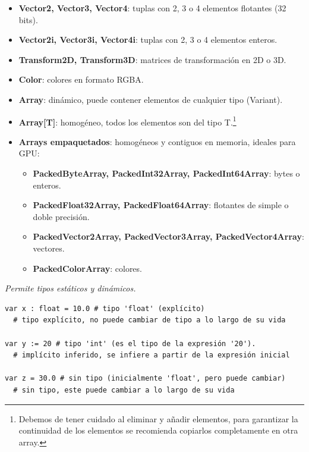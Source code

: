 \documentclass[12pt]{report} %
\begin{document}
\begin{itemize}
\item \textbf{Vector2, Vector3, Vector4}: tuplas con 2, 3 o 4 elementos flotantes (32 bits).
\item \textbf{Vector2i, Vector3i, Vector4i}: tuplas con 2, 3 o 4 elementos enteros.
\item \textbf{Transform2D, Transform3D}: matrices de transformación en 2D o 3D.
\end{itemize}

\begin{itemize}
\item \textbf{Color}: colores en formato RGBA.
\end{itemize}

\begin{itemize}
\item \textbf{Array}: dinámico, puede contener elementos de cualquier tipo (Variant).
\item \textbf{Array[T]}: homogéneo, todos los elementos son del tipo T.\footnote{Debemos de tener cuidado al eliminar y añadir elementos, para garantizar la continuidad de los elementos se recomienda copiarlos completamente en otra array.}
\item \textbf{Arrays empaquetados}: homogéneos y contiguos en memoria, ideales para GPU:
  \begin{itemize}
  \item \textbf{PackedByteArray, PackedInt32Array, PackedInt64Array}: bytes o enteros.
  \item \textbf{PackedFloat32Array, PackedFloat64Array}: flotantes de simple o doble precisión.
  \item \textbf{PackedVector2Array, PackedVector3Array, PackedVector4Array}: vectores.
  \item \textbf{PackedColorArray}: colores.
  \end{itemize}
\end{itemize}

\emph{Permite tipos estáticos y dinámicos.}

\begin{lstlisting}
var x : float = 10.0 # tipo 'float' (explícito) 
  # tipo explícito, no puede cambiar de tipo a lo largo de su vida

var y := 20 # tipo 'int' (es el tipo de la expresión '20').
  # implícito inferido, se infiere a partir de la expresión inicial

var z = 30.0 # sin tipo (inicialmente 'float', pero puede cambiar)
  # sin tipo, este puede cambiar a lo largo de su vida
\end{lstlisting}
\end{document}

